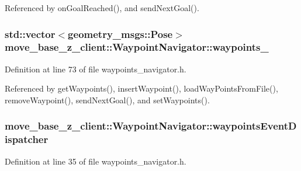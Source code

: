 Referenced by on\+Goal\+Reached(), and send\+Next\+Goal().

\subsubsection[{\texorpdfstring{waypoints\+\_\+}{waypoints_}}]{\setlength{\rightskip}{0pt plus 5cm}std\+::vector$<$geometry\+\_\+msgs\+::\+Pose$>$ move\+\_\+base\+\_\+z\+\_\+client\+::\+Waypoint\+Navigator\+::waypoints\+\_\+\hspace{0.3cm}{\ttfamily [private]}}\hypertarget{classmove__base__z__client_1_1WaypointNavigator_a83e4e39987eaf1c8856d32d581eb4cd0}{}\label{classmove__base__z__client_1_1WaypointNavigator_a83e4e39987eaf1c8856d32d581eb4cd0}


Definition at line 73 of file waypoints\+\_\+navigator.\+h.



Referenced by get\+Waypoints(), insert\+Waypoint(), load\+Way\+Points\+From\+File(), remove\+Waypoint(), send\+Next\+Goal(), and set\+Waypoints().

\subsubsection[{\texorpdfstring{waypoints\+Event\+Dispatcher}{waypointsEventDispatcher}}]{ move\+\_\+base\+\_\+z\+\_\+client\+::\+Waypoint\+Navigator\+::waypoints\+Event\+Dispatcher}\hypertarget{classmove__base__z__client_1_1WaypointNavigator_a488a89db6cd20bc12548ac454254829f}{}\label{classmove__base__z__client_1_1WaypointNavigator_a488a89db6cd20bc12548ac454254829f}


Definition at line 35 of file waypoints\+\_\+navigator.\+h.



